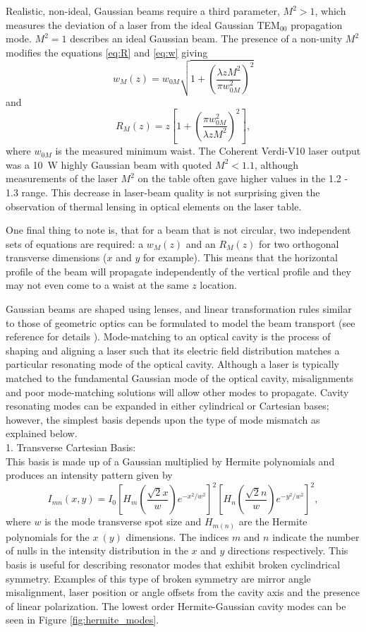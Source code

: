 Realistic, non-ideal, Gaussian beams require a third parameter, $M^2>1$, which measures the deviation of a laser from the ideal Gaussian TEM$_{00}$ propagation mode. $M^2=1$ describes an ideal Gaussian beam. The presence of a non-unity $M^2$ modifies the equations \ref{eq:R} and \ref{eq:w} giving 
\begin{equation}
w_M(z)=w_{0M}\sqrt{1+\left(\frac{\lambda z M^2}{\pi w_{0M}^2}\right)^2}
\label{eq:w_m}
\end{equation}
and
\begin{equation}
R_{M}(z)=z\left[1+\left(\frac{\pi w_{0M}^2}{\lambda z M^2}\right)^2\right],
\label{eq:R_m}
\end{equation}
where $w_{0M}$ is the measured minimum waist. The Coherent Verdi-V10 laser output was a 10~W highly Gaussian beam with quoted $M^2<1.1$, although measurements of the laser $M^2$ on the table often gave higher values in the 1.2 - 1.3 range. This decrease in laser-beam quality is not surprising given the observation of thermal lensing in optical elements on the laser table.

One final thing to note is, that for a beam that is not circular, two independent sets of equations are required: a $w_M(z)$ and an $R_M(z)$ for two orthogonal transverse dimensions ($x$ and $y$ for example). This means that the horizontal profile of the beam will propagate independently of the vertical profile and they may not even come to a waist at the same $z$ location. 

Gaussian beams are shaped using lenses, and linear transformation rules similar to those of geometric optics can be formulated to model the beam transport (see reference for details \cite{Kogelnik}). Mode-matching to an optical cavity is the process of shaping and aligning a laser such that its electric field distribution matches a particular resonating mode of the optical cavity. Although a laser is typically matched to the fundamental Gaussian mode of the optical cavity, misalignments and poor mode-matching solutions will allow other modes to propagate. Cavity resonating modes can be expanded in either cylindrical or Cartesian bases; however, the simplest basis depends upon the type of mode mismatch as explained below\cite{Anderson}. \\
1. Transverse Cartesian Basis:\\
This basis is made up of a Gaussian multiplied by Hermite polynomials and produces an intensity pattern given by 
\[I_{mn}(x,y)=I_0\left[H_m\left(\frac{\sqrt{2}x}{w}\right)e^{-x^2/w^2}\right]^2\left[H_n\left(\frac{\sqrt{2}n}{w}\right)e^{-y^2/w^2}\right]^2,
\] 
where $w$ is the mode transverse spot size and $H_{m(n)}$ are the Hermite polynomials for the $x~(y)$ dimensions. The indices $m$ and $n$ indicate the number of nulls in the intensity distribution in the $x$ and $y$ directions respectively. This basis is useful for describing resonator modes that exhibit broken cyclindrical symmetry. Examples of this type of broken symmetry are mirror angle misalignment, laser position or angle offsets from the cavity axis and the presence of linear polarization. The lowest order Hermite-Gaussian cavity modes can be seen in Figure \ref{fig:hermite_modes}.

